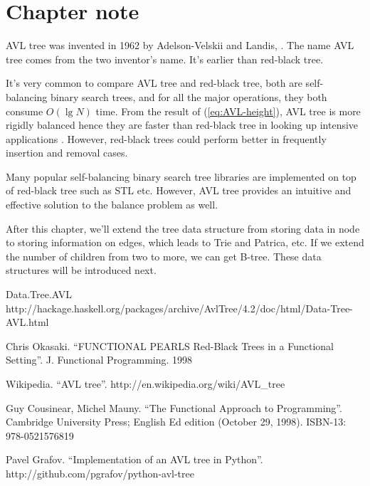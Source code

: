 \documentclass{article}
\begin{document}
\section{Chapter note}
AVL tree was invented in 1962 by Adelson-Velskii and Landis\cite{wiki},
\cite{TFATP}. The name AVL tree comes from the two inventor's name. It's earlier than red-black tree.

It's very common to compare AVL tree and red-black tree, both are self-balancing binary search trees, and for all the major operations, they both consume $O(\lg N)$ time. From the result of (\ref{eq:AVL-height}), AVL tree is more rigidly balanced hence they are faster than red-black tree in looking up intensive applications \cite{wiki}. However, red-black trees could perform better in frequently insertion and removal cases.

Many popular self-balancing binary search tree libraries are implemented on top of red-black tree such as STL etc. However, AVL tree provides an intuitive and effective solution to the balance problem as well.

After this chapter, we'll extend the tree data structure from storing data in node to storing information on edges, which leads to Trie and Patrica, etc. If we extend the number of children from two to more, we can get B-tree. These data structures will be introduced next.

\begin{thebibliography}{99}

Data.Tree.AVL http://hackage.haskell.org/packages/archive/AvlTree/4.2/doc/html/Data-Tree-AVL.html

Chris Okasaki. ``FUNCTIONAL PEARLS Red-Black Trees in a Functional Setting''. J. Functional Programming. 1998

Wikipedia. ``AVL tree''. http://en.wikipedia.org/wiki/AVL\_tree

Guy Cousinear, Michel Mauny. ``The Functional Approach to Programming''. Cambridge University Press; English Ed edition (October 29, 1998). ISBN-13: 978-0521576819

Pavel Grafov. ``Implementation of an AVL tree in Python''. http://github.com/pgrafov/python-avl-tree
\end{thebibliography}

\ifx\wholebook\relax\else
\end{document}
